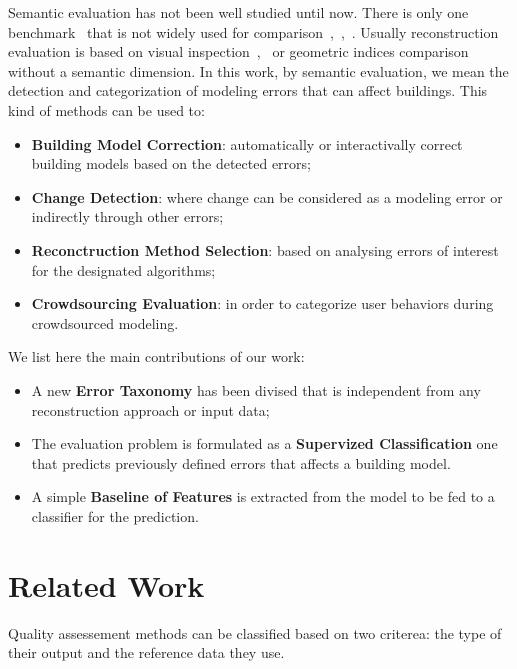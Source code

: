 \documentclass[runningheads]{llncs}
\begin{document}
	Semantic evaluation has not been well studied until now. There is only one benchmark~\cite{rottensteiner2014results} that is not widely used for comparison~\cite{Lafarge2012},~\cite{nguatem2017modeling},~\cite{li2016boxfitting}. Usually reconstruction evaluation is based on visual inspection~\cite{Musialski2012},~\cite{MacayMoreia2013} or geometric indices comparison~\cite{Kaartinen2005} without a semantic dimension. In this work, by semantic evaluation, we mean the detection and categorization of modeling errors that can affect buildings. This kind of methods can be used to:
	\begin{itemize}
		\item \textbf{Building Model Correction}: automatically or interactivally correct building models based on the detected errors;
		\item \textbf{Change Detection}: where change can be considered as a modeling error or indirectly through other errors;
		\item \textbf{Reconctruction Method Selection}: based on analysing errors of interest for the designated algorithms;
		\item \textbf{Crowdsourcing Evaluation}: in order to categorize user behaviors during crowdsourced modeling.
	\end{itemize}
	
	We list here the main contributions of our work:
	\begin{itemize}
		\item A new \textbf{Error Taxonomy} has been divised that is independent from any reconstruction approach or input data;
		\item The evaluation problem is formulated as a \textbf{Supervized Classification} one that predicts previously defined errors that affects a building model.
		\item A simple \textbf{Baseline of Features} is extracted from the model to be fed to a classifier for the prediction.
	\end{itemize}
\section{Related Work}

Quality assessement methods can be classified based on two criterea: the type of their output and the reference data they use.
\end{document}
